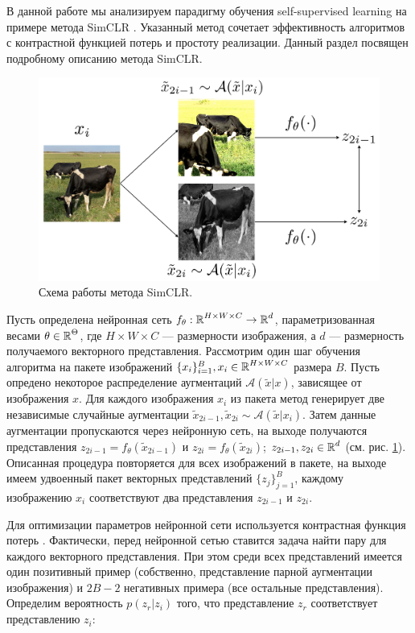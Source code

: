 В данной работе мы анализируем парадигму обучения self-supervised \linebreak learning на примере метода SimCLR \cite{simclr}. Указанный метод сочетает эффективность алгоритмов с контрастной функцией потерь и простоту реализации. Данный раздел посвящен подробному описанию метода SimCLR.

\begin{figure}[H]
    \centering
    \includegraphics[width=14cm]{images/simclr.png}
    \caption{Схема работы метода SimCLR.}
    \label{simclr:pic:1}
\end{figure}{}

Пусть определена нейронная сеть $f_{\theta}: \operatorname{\mathbb{R}}^{H \times W \times C} \rightarrow \operatorname{\mathbb{R}}^d$, параметризованная весами $\theta \in \operatorname{\mathbb{R}}^{\Theta}$, где $H \times W \times C$ --- размерности изображения, а $d$ --- размерность получаемого векторного представления. Рассмотрим один шаг обучения алгоритма на пакете изображений $\{x_i\}_{i=1}^B, x_i \in \operatorname{\mathbb{R}}^{H \times W \times C}$ размера $B$. Пусть опредено некоторое распределение аугментаций $\mathcal{A}(\tilde{x}|x)$, зависящее от изображения $x$. Для каждого изображения $x_i$ из пакета метод генерирует две независимые случайные аугментации $\tilde{x}_{2i-1}, \tilde{x}_{2i} \sim \mathcal{A}(\tilde{x}|x_i)$. Затем данные аугментации пропускаются через нейронную сеть, на выходе получаются представления $z_{2i-1} = f_{\theta}(\tilde{x}_{2i-1})$ и $z_{2i} = f_{\theta}(\tilde{x}_{2i})$; $z_{2i-1}, z_{2i} \in \operatorname{\mathbb{R}}^d$ (см. рис. \ref{simclr:pic:1}). Описанная процедура повторяется для всех изображений в пакете, на выходе имеем удвоенный пакет векторных представлений $\{z_{j}\}_{j=1}^B$, каждому изображению $x_i$ соответствуют два представления $z_{2i-1}$ и $z_{2i}$.

Для оптимизации параметров нейронной сети используется контрастная функция потерь \cite{contrastive}. Фактически, перед нейронной сетью ставится задача найти пару для каждого векторного представления. При этом среди всех представлений имеется один позитивный пример (собственно, представление парной аугментации изображения) и $2B-2$ негативных примера (все остальные представления). Определим вероятность $p(z_r|z_i)$ того, что представление $z_r$ соответствует представлению $z_i$:

